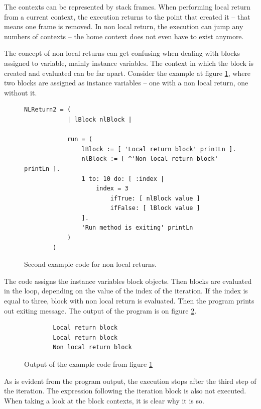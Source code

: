 \documentclass[thesis=M,english]{FITthesis}[2019/12/23]
\begin{document}
The contexts can be represented by stack frames. When performing local return from a current context, the execution returns to the
point that created it -- that means one frame is removed. In non local return, the execution can jump any numbers of contexts -- the
home context does not even have to exist anymore.

The concept of non local returns can get confusing when dealing with blocks assigned to variable, mainly instance variables.
The context in which the block is created and evaluated can be far apart. Consider the example at figure \ref{fig:nlreturn_2}, where two blocks are
assigned as instance variables -- one with a non local return, one without it.

\begin{figure}
	\centering
	\begin{lstlisting}[language=Smalltalk]
		NLReturn2 = (
			| lBlock nlBlock |

			run = (
				lBlock := [ 'Local return block' printLn ].
				nlBlock := [ ^'Non local return block' printLn ].
				1 to: 10 do: [ :index |
					index = 3
						ifTrue: [ nlBlock value ]
						ifFalse: [ lBlock value ]
				].
				'Run method is exiting' printLn
			)
		)
	\end{lstlisting}
	\caption{Second example code for non local returns.}
	\label{fig:nlreturn_2}
\end{figure}

The code assigns the instance variables block objects. Then blocks are evaluated in the loop, depending on the value
of the index of the iteration. If the index is equal to three, block with non local return is evaluated. Then the program
prints out exiting message. The output of the program is on figure \ref{fig:nlreturn_2_output}.

\begin{figure}[h!]
	\centering
	\begin{verbatim}
		Local return block
		Local return block
		Non local return block
	\end{verbatim}
	\caption{Output of the example code from figure \ref{fig:nlreturn_2}}
	\label{fig:nlreturn_2_output}
\end{figure}

As is evident from the program output, the execution stops after the third step of the iteration. The expression
following the iteration block is also not executed. When taking a look at the block contexts, it is clear why it is so.
\end{document}
